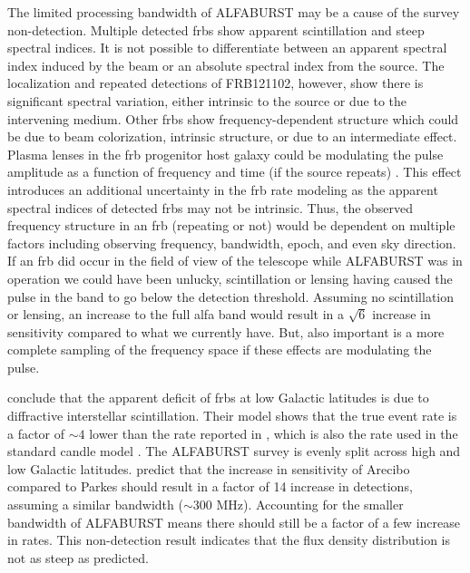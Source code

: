 \documentclass[a4paper,fleqn,usenatbib]{mnras}
\begin{document}
The limited processing bandwidth of ALFABURST may be a cause of the survey
non-detection. Multiple detected \glspl{frb} show apparent scintillation and
steep spectral indices. It is not possible to differentiate between an apparent
spectral index induced by the beam or an absolute spectral index from the
source. The localization and repeated detections of FRB121102, however, show
there is significant spectral variation, either intrinsic to the source or due
to the intervening medium. Other \glspl{frb} show frequency-dependent structure
which could be due to beam colorization, intrinsic structure, or due to an
intermediate effect. Plasma lenses in the \gls{frb} progenitor host galaxy could
be modulating the pulse amplitude as a function of frequency and time (if the
source repeats) \citep{2017ApJ...842...35C}. This effect introduces an
additional uncertainty in the \gls{frb} rate modeling as the apparent spectral
indices of detected \glspl{frb} may not be intrinsic. Thus, the observed
frequency structure in an \gls{frb} (repeating or not) would be dependent on
multiple factors including observing frequency, bandwidth, epoch, and even sky
direction. If an \gls{frb} did occur in the field of view of the telescope while
ALFABURST was in operation we could have been unlucky, scintillation or lensing
having caused the pulse in the band to go below the detection threshold.
Assuming no scintillation or lensing, an increase to the full \gls{alfa} band
would result in a $\sqrt{6}$ increase in sensitivity compared to what we
currently have. But, also important is a more complete sampling of the frequency
space if these effects are modulating the pulse.

\cite{2015MNRAS.451.3278M} conclude that the apparent deficit of \glspl{frb} at
low Galactic latitudes is due to diffractive interstellar scintillation. Their
model shows that the true event rate is a factor of $\sim 4$ lower than the rate
reported in \cite{2013Sci...341...53T}, which is also the rate used in the standard
candle model \citep{2013MNRAS.436L...5L}. The ALFABURST survey is evenly
split across high and low Galactic latitudes.  \cite{2015MNRAS.451.3278M} predict
that the increase in sensitivity of Arecibo compared to Parkes should
result in a factor of 14 increase in detections, assuming a similar bandwidth
($\sim 300$ MHz). Accounting for the smaller bandwidth of ALFABURST means there
should still be a factor of a few increase in rates. This non-detection result
indicates that the \cite{2015MNRAS.451.3278M} flux density distribution is not
as steep as predicted.
\end{document}
